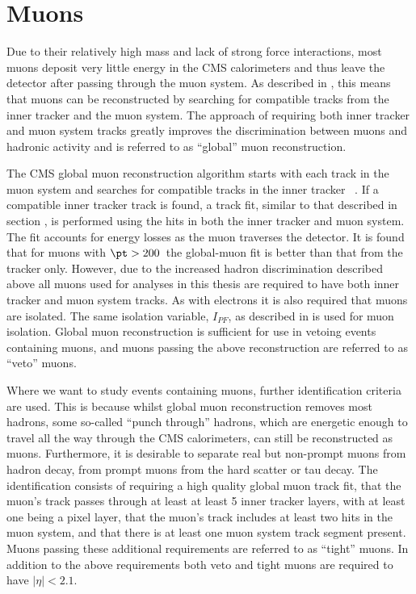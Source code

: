 \section{Muons}
\label{sec:muons}
Due to their relatively high mass and lack of strong force interactions, most muons deposit very little energy in the CMS calorimeters and thus leave the detector after passing through the muon system. As described in , this means that muons can be reconstructed by searching for compatible tracks from the inner tracker and the muon system. The approach of requiring both inner tracker and muon system tracks greatly improves the discrimination between muons and hadronic activity and is referred to as ``global'' muon reconstruction.

The CMS global muon reconstruction algorithm starts with each track in the muon system and searches for compatible tracks in the inner tracker ~\cite{MuonReco}. If a compatible inner tracker track is found, a track fit, similar to that described in section , is performed using the hits in both the inner tracker and muon system. The fit accounts for energy losses as the muon traverses the detector. It is found that for muons with $\pt>200$\GeV\, the global-muon fit is better than that from the tracker only. However, due to the increased hadron discrimination described above all muons used for analyses in this thesis are required to have both inner tracker and muon system tracks. As with electrons it is also required that muons are isolated. The same isolation variable, $I_{PF}$, as described in  is used for muon isolation. Global muon reconstruction is sufficient for use in vetoing events containing muons, and muons passing the above reconstruction are referred to as ``veto'' muons.

Where we want to study events containing muons, further identification criteria are used. This is because whilst global muon reconstruction removes most hadrons, some so-called ``punch through'' hadrons, which are energetic enough to travel all the way through the CMS calorimeters, can still be reconstructed as muons. Furthermore, it is desirable to separate real but non-prompt muons from hadron decay, from prompt muons from the hard scatter or tau decay. The identification consists of requiring a high quality global muon track fit, that the muon's track passes through at least at least 5 inner tracker layers, with at least one being a pixel layer, that the muon's track includes at least two hits in the muon system, and that there is at least one muon system track segment present. Muons passing these additional requirements are referred to as ``tight'' muons. In addition to the above requirements both veto and tight muons are required to have $|\eta|<2.1$.

